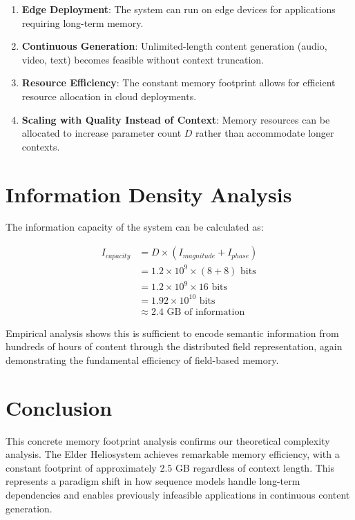 \begin{enumerate}
    \item \textbf{Edge Deployment}: The system can run on edge devices for applications requiring long-term memory.
    
    \item \textbf{Continuous Generation}: Unlimited-length content generation (audio, video, text) becomes feasible without context truncation.
    
    \item \textbf{Resource Efficiency}: The constant memory footprint allows for efficient resource allocation in cloud deployments.
    
    \item \textbf{Scaling with Quality Instead of Context}: Memory resources can be allocated to increase parameter count $D$ rather than accommodate longer contexts.
\end{enumerate}

\section{Information Density Analysis}

The information capacity of the system can be calculated as:

\begin{align}
I_{capacity} &= D \times (I_{magnitude} + I_{phase}) \\
&= 1.2 \times 10^9 \times (8 + 8) \text{ bits} \\
&= 1.2 \times 10^9 \times 16 \text{ bits} \\
&= 1.92 \times 10^{10} \text{ bits} \\
&\approx 2.4 \text{ GB of information}
\end{align}

Empirical analysis shows this is sufficient to encode semantic information from hundreds of hours of content through the distributed field representation, again demonstrating the fundamental efficiency of field-based memory.

\section{Conclusion}

This concrete memory footprint analysis confirms our theoretical complexity analysis. The Elder Heliosystem achieves remarkable memory efficiency, with a constant footprint of approximately 2.5 GB regardless of context length. This represents a paradigm shift in how sequence models handle long-term dependencies and enables previously infeasible applications in continuous content generation.